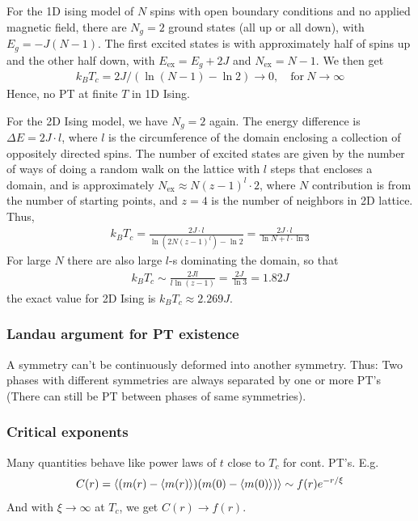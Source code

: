 \documentclass[a4paper, english, 12pt]{article}
\begin{document}
\begin{multicols*}{2}
For the 1D ising model of $N$ spins with open boundary conditions and no applied magnetic field, there are $N_g=2$ ground states (all up or all down), with $E_g=-J(N-1)$. The first excited states is with approximately half of spins up and the other half down, with $E_\mathrm{ex}=E_g+2J$ and $N_\mathrm{ex}=N-1$. We then get 
\begin{align*}
    k_B T_c = 2J/(\ln(N-1)-\ln 2) \to 0,\quad\text{for}\: N\to\infty
\end{align*}
Hence, no PT at finite $T$ in 1D Ising. 

For the 2D Ising model, we have $N_g=2$ again. The energy difference is $\Delta E=2J\cdot l$, where $l$ is the circumference of the domain enclosing a collection of oppositely directed spins. The number of excited states are given by the number of ways of doing a random walk on the lattice with $l$ steps that encloses a domain, and is approximately $N_\mathrm{ex}\approx N(z-1)^l \cdot 2$, where $N$ contribution is from the number of starting points, and $z=4$ is the number of neighbors in 2D lattice. Thus,
\begin{align*}
    k_B T_c = \frac{2J\cdot l}{\ln(2N(z-1)^l)-\ln2} = \frac{2J \cdot l}{\ln N + l\cdot \ln3}
\end{align*}
For large $N$ there are also large $l$-s dominating the domain, so that 
\begin{align*}
    k_B T_c\sim \frac{2Jl}{l\ln(z-1)}=\frac{2J}{\ln3}=1.82 J
\end{align*}
the exact value for 2D Ising is $k_B T_c\approx 2.269J$.

\subsubsection*{\tiny Landau argument for PT existence}
A symmetry can't be continuously deformed into another symmetry. Thus: Two phases with different symmetries are always separated by one or more PT's (There can still be PT between phases of same symmetries).


\subsubsection*{\scriptsize Critical exponents}
Many quantities behave like power laws of $t$ close to $T_c$ for cont. PT's. E.g. 
\begin{align*}
    C(r) = \expval{(m(r) - \expval{m(r)})(m(0) - \expval{m(0)})} \sim f(r) e^{-r/ \xi} 
\end{align*}
And with $\xi\to\infty$ at $T_c$, we get $C(r)\to f(r)$. 


\end{multicols*}
\end{document}
